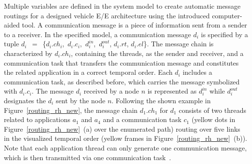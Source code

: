      Multiple variables are defined in the system model to create automatic message routings for a designed vehicle E/E architecture using the introduced computer-aided tool. A communication message is a piece of information sent from a sender to a receiver. In the specified model, a communication message $d_i$ is specified by a tuple $d_i$~$=$~\{$d_i.ch_i$,~$d_i.c_i$,~$d_i^{in}$,~$d_i^{out}$, $d_i.rt$, $d_i.el$\}. The message chain is characterized by $d_i.ch_i$, containing the threads, as the sender and receiver, and a communication task that transfers the communication message and constitutes the related application in a correct temporal order. Each $d_i$ includes a communication task, as described before, which carries the message symbolized with $d_i.c_i$.
    The message $d_i$ received by a node $n$ is represented as $d_i^{in}$ while $d_i^{out}$ designates the
    $d_i$ sent by the node $n$. Following the shown example in Figure~\ref{routing_rh_new}, the message chain $d_1.ch_1$ for $d_1$ consists of two threads related to applications $a_{1}$ and $a_{4}$ and a communication task $c_1$ (yellow dots in Figure~\ref{routing_rh_new}~(a) over the enumerated path) routing over five links in the visualized temporal order (yellow frames in Figure~\ref{routing_rh_new}~(b)). Note that each application thread can only generate one communication message, which is then transmitted via one communication task~\cite{askaripoor2023designer}. 

